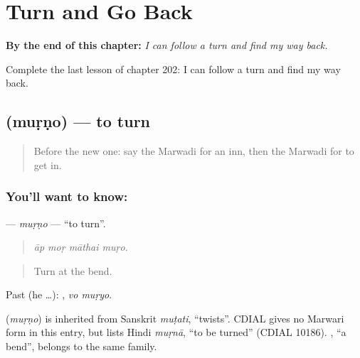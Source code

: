 
\chapter{Turn and Go Back}
\label{ch:mw-turn-and-go-back}

\begin{chapteropening}
\textbf{By the end of this chapter:} \emph{I can follow a turn and find my way back.}

Complete the last lesson of chapter 202: I can follow a turn and find my way back.
\end{chapteropening}

\section[\texorpdfstring{\mw{मुड़णो} (muṛṇo)}{मुड़णो (muṛṇo)}]{ (muṛṇo) — to turn}

\label{lesson:MW-C202-murno}



\begin{quote}
Before the new one: say the Marwadi for an inn, then the Marwadi for to get in.
\end{quote}

\subsection*{You'll want to know: }
\textbf{} — \emph{muṛṇo} — \textquotedblleft{}to turn\textquotedblright{}.

\begin{quote}
   
\end{quote}

\begin{quote}
\emph{āp moṛ māthai muṛo.}
\end{quote}

\begin{quote}
Turn at the bend.
\end{quote}

Past (he …):  , \emph{vo muṛyo}.

\begin{cousinweb}
\textbf{} (\emph{muṛṇo}) is inherited from Sanskrit \emph{muṭati}, \textquotedblleft{}twists\textquotedblright{}. CDIAL gives no Marwari form in this entry, but lists Hindi \emph{muṛnā}, \textquotedblleft{}to be turned\textquotedblright{} (CDIAL 10186). \textbf{}, \textquotedblleft{}a bend\textquotedblright{}, belongs to the same family.
\end{cousinweb}

